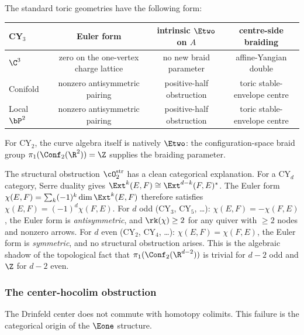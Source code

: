 \noindent The standard toric geometries have the following form:
\begin{center}
\renewcommand{\arraystretch}{1.3}
\small
\begin{tabular}{lccc}
 \toprule
 \textbf{CY$_3$} & Euler form & intrinsic \(\Etwo\) on \(A\) & centre-side braiding \\
 \midrule
 $\C^3$ & zero on the one-vertex charge lattice & no new braid parameter & affine-Yangian double \\
 Conifold & nonzero antisymmetric pairing & positive-half obstruction & toric stable-envelope centre \\
 Local $\bP^2$ & nonzero antisymmetric pairing & positive-half obstruction & toric stable-envelope centre \\
 \bottomrule
\end{tabular}
\end{center}

For CY$_2$, the curve algebra itself is natively \(\Etwo\): the
configuration-space braid group \(\pi_1(\Conf_2(\R^2))=\Z\) supplies the
braiding parameter.

\begin{remark}
\label{rem:serre-duality-origin}
The structural obstruction $\cO_2^{\mathrm{str}}$ has a clean categorical explanation. For a CY$_d$ category, Serre duality gives $\Ext^k(E, F) \cong \Ext^{d-k}(F, E)^*$. The Euler form $\chi(E, F) = \sum_k (-1)^k \dim \Ext^k(E, F)$ therefore satisfies $\chi(E, F) = (-1)^d \chi(F, E)$. For $d$ odd (CY$_3$, CY$_5$, \ldots): $\chi(E, F) = -\chi(F, E)$, the Euler form is \emph{antisymmetric}, and $\rk(\chi) \geq 2$ for any quiver with $\geq 2$ nodes and nonzero arrows. For $d$ even (CY$_2$, CY$_4$, \ldots): $\chi(E, F) = \chi(F, E)$, the Euler form is \emph{symmetric}, and no structural obstruction arises. This is the algebraic shadow of the topological fact that $\pi_1(\Conf_2(\R^{d-2}))$ is trivial for $d - 2$ odd and $\Z$ for $d - 2$ even.
\end{remark}


\subsubsection{The center-hocolim obstruction}
\label{subsubsec:center-hocolim}

The Drinfeld center does not commute with homotopy colimits. This failure is the categorical origin of the $\Eone$ structure.

